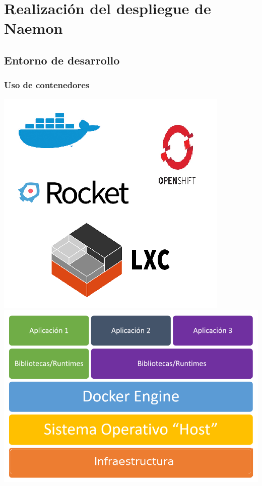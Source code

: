 \documentclass{beamer}
\theoremstyle{plain}
\theoremstyle{definition}
\theoremstyle{plain}
\theoremstyle{definition}
\theoremstyle{remark}
\theoremstyle{definition}
\begin{document}
\section{Realización del despliegue de Naemon} %


\subsection{Entorno de desarrollo}
\begin{frame}
	\frametitle{Uso de contenedores}
	\centering
	\includegraphics[scale=0.4]{imagenes/comparativaContenedores.png}
	\includegraphics[scale=0.3]{imagenes/contenedores.png}
	
\end{frame}
\end{document}
